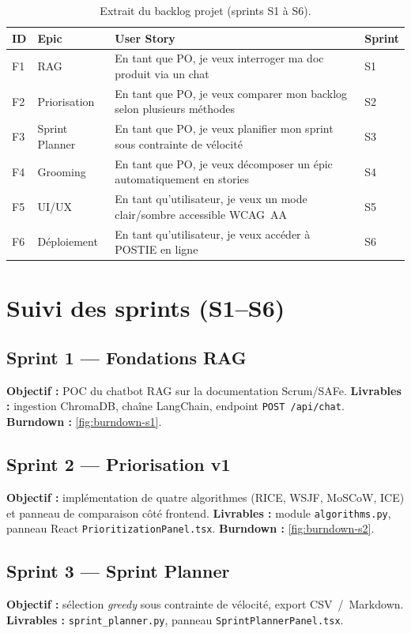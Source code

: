 \begin{table}[H]\centering\small
\caption{Extrait du backlog projet (sprints S1 à S6).}
\label{tab:backlog}
\begin{tabularx}{\linewidth}{llXl}
\toprule
\textbf{ID} & \textbf{Epic} & \textbf{User Story} & \textbf{Sprint}\\
\midrule
F1 & RAG            & En tant que PO, je veux interroger ma doc produit via un chat        & S1\\
F2 & Priorisation   & En tant que PO, je veux comparer mon backlog selon plusieurs méthodes & S2\\
F3 & Sprint Planner & En tant que PO, je veux planifier mon sprint sous contrainte de vélocité & S3\\
F4 & Grooming       & En tant que PO, je veux décomposer un épic automatiquement en stories   & S4\\
F5 & UI/UX          & En tant qu'utilisateur, je veux un mode clair/sombre accessible WCAG~AA  & S5\\
F6 & Déploiement    & En tant qu'utilisateur, je veux accéder à POSTIE en ligne                & S6\\
\bottomrule
\end{tabularx}
\end{table}

\section{Suivi des sprints (S1--S6)}

\subsection*{Sprint 1 --- Fondations RAG}
\textbf{Objectif :} POC du chatbot RAG sur la documentation Scrum/SAFe.
\textbf{Livrables :} ingestion ChromaDB, chaîne LangChain, endpoint
\texttt{POST /api/chat}. \textbf{Burndown :} \cref{fig:burndown-s1}.

\subsection*{Sprint 2 --- Priorisation v1}
\textbf{Objectif :} implémentation de quatre algorithmes (RICE, WSJF,
MoSCoW, ICE) et panneau de comparaison côté frontend.
\textbf{Livrables :} module \texttt{algorithms.py}, panneau React
\texttt{PrioritizationPanel.tsx}. \textbf{Burndown :}
\cref{fig:burndown-s2}.

\subsection*{Sprint 3 --- Sprint Planner}
\textbf{Objectif :} sélection \emph{greedy} sous contrainte de
vélocité, export CSV~/~Markdown. \textbf{Livrables :}
\texttt{sprint\_planner.py}, panneau \texttt{SprintPlannerPanel.tsx}.

